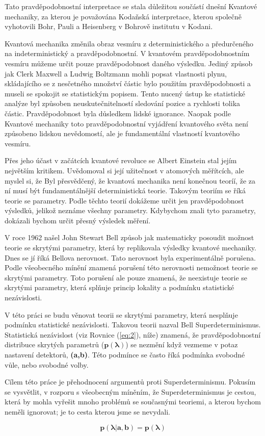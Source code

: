 Tato pravděpodobnostní interpretace se stala důležitou součástí dnešní Kvantové mechaniky, za kterou je považována Kodaňská interpretace, kterou společně vyhotovili Bohr, Pauli a Heisenberg v Bohrově institutu v Kodani.

Kvantová mechanika změnila obraz vesmíru z deterministického a předurčeného na indeterministický a pravděpodobnostní. V kvantovém pravděpodobnostním vesmíru můžeme určit pouze pravděpodobnost daného výsledku. Jediný způsob jak Clerk Maxwell a Ludwig Boltzmann mohli popsat vlastnosti plynu, skládajícího se z nesčetného množství částic bylo použitím pravděpodob\-nosti a museli se spokojit se statistickým popisem. Tento nucený ústup ke statistické analýze byl způsoben neuskutečnitelností sledování pozice a rychlosti tolika částic. Pravděpodob\-nost byla důsledkem lidské ignorance. Naopak podle Kvantové mechaniky toto pravděpodobnost\-ní vyjádření kvantového světa není způsobeno lidskou nevědomostí, ale je fundamentální vlastností kvantového vesmíru.

Přes jeho účast v začátcích kvantové revoluce se Albert Einstein stal jejím největším kritikem. Uvědomoval si její užitečnost v atomových měřítcích, ale myslel si, že  Byl přesvědčený, že kvantová mechanika není konečnou teoríí, že za ní musí být fundamentálnější deterministická teorie. Takovým teoriím se říká teorie se  parametry. Podle těchto teorií dokážeme určit jen pravděpodobnost výsledků, jelikož neznáme všechny parametry. Kdybychom znali tyto  parametry, dokázali bychom určit přesný výsledek měření.

V roce 1962 našel John Stewart Bell způsob jak matematicky posoudit možnost teorie se skrytými parametry, která by replikovala výsledky kvantové mechaniky. Dnes se jí říká Bellova nerovnost. Tato nerovnost byla experimentálně porušena. Podle všeobecného mínění znamená porušení této nerovnosti nemožnost teorie se skrytými parametry. Toto porušení ale pouze znamená, že neexistuje teorie se skrytými parametry, která splňuje princip lokality a podmínku statistické nezávislosti.

V této práci se budu věnovat teorii se skrytými parametry, která nesplňuje podmínku statistické nezávislosti. Takovou teorii nazval Bell Superdeterminismus. Statistická nezávislost (viz Rovnice (\ref{eq:2}), níže) znamená, že pravděpodobnostní distribuce skrytých parametrů ($\bm{p(\lambda)}$) se nezmění když vezmeme v potaz nastavení detektorů, \textbf{(a,b)}. Této podmínce se často říká podmín\-ka svobodné vůle, nebo svobodné volby. 

Cílem této práce je přehodnocení argumentů proti Superdeterminismu. Pokusím se vysvětlit, v rozporu s všeobecným míněním, že Superdeterminismus je cestou, která by mohla vyřešit mnoho problémů se současnými teoriemi, a kterou bychom neměli ignorovat; je to cesta kterou jsme se nevydali.

\begin{equation}
    \bm{p(\lambda|\bm{a},\bm{b}) = p(\lambda)} 
    \label{eq:2}
\end{equation}

